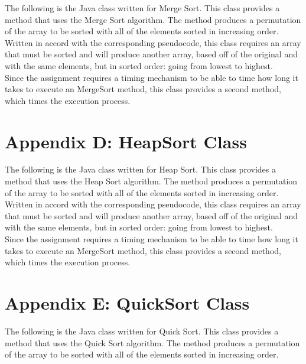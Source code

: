\documentclass[12pt]{article}
\begin{document}
The following is the Java class written for Merge Sort. This class provides a method that uses the Merge Sort algorithm. The method produces a permutation of the array to be sorted with all of the elements sorted in increasing order. \\

Written in accord with the corresponding pseudocode, this class requires an array that must be sorted and will produce another array, based off of the original and with the same elements, but in sorted order: going from lowest to highest. \\

Since the assignment requires a timing mechanism to be able to time how long it takes to execute an MergeSort method, this class provides a second method, which times the execution process. 

\hrulefill 

\pagebreak

\section*{Appendix D: HeapSort Class}

The following is the Java class written for Heap Sort. This class provides a method that uses the Heap Sort algorithm. The method produces a permutation of the array to be sorted with all of the elements sorted in increasing order. \\

Written in accord with the corresponding pseudocode, this class requires an array that must be sorted and will produce another array, based off of the original and with the same elements, but in sorted order: going from lowest to highest. \\

Since the assignment requires a timing mechanism to be able to time how long it takes to execute an MergeSort method, this class provides a second method, which times the execution process. 

\hrulefill 

\pagebreak

\section*{Appendix E: QuickSort Class}

The following is the Java class written for Quick Sort. This class provides a method that uses the Quick Sort algorithm. The method produces a permutation of the array to be sorted with all of the elements sorted in increasing order. \\
\end{document}
